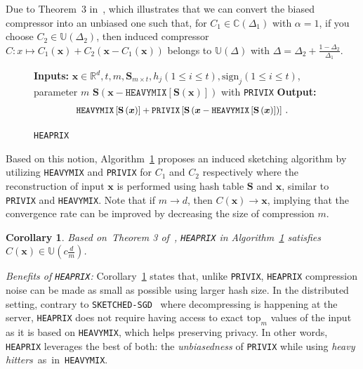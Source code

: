 \documentclass{article} %
\newtheorem{corollary}{Corollary}
\newcommand*{\Resize}[2]{\resizebox{#1}{!}{$#2$}}%
\begin{document}
Due to Theorem~$3$ in~\cite{horvath2020better}, which illustrates that we can convert the biased compressor into an unbiased one such that, for $C_1\in \mathbb{C}(\Delta_1)$ with $\alpha=1$, if you choose $C_2\in \mathbb{U}(\Delta_2)$, then induced compressor $C: x \mapsto C_1(\mathbf{x})+C_2\left(\mathbf{x}-C_1\left(\mathbf{x}\right)\right)$ belongs to $\mathbb{U}(\Delta)$ with $\Delta=\Delta_2+\frac{1-\Delta_2}{\Delta_1}$. 
\begin{figure}\vspace{-0.2in}
\begin{minipage}{\linewidth}
\begin{algorithm}[H]
\caption{\texttt{HEAPRIX} }\label{alg:heaprix}
\begin{algorithmic}[1]
\STATE \textbf{Inputs:} $\boldsymbol{x}\in\mathbb{R}^{d}, t, m, \mathbf{S}_{m\times t}, h_j (1\leq i\leq t), \text{sign}_j (1\leq i\leq t)$, parameter $m$
 $\mathbf{S}\left(\boldsymbol{x} - \texttt{HEAVYMIX}[\mathbf{S}(\boldsymbol{x})]\right)$ with \texttt{PRIVIX} 
\STATE \textbf{Output:}
\vspace{- 0.1cm}
\[ \Resize{7.4cm}{\texttt{HEAVYMIX}\left[\mathbf{S}\left(\boldsymbol{x}\right)\right]+\texttt{PRIVIX}\left[\mathbf{S}\left(\boldsymbol{x}-\texttt{HEAVYMIX}\left[\mathbf{S}\left(\boldsymbol{x}\right)\right]\right)\right]}\ .\]
\end{algorithmic}
\end{algorithm}
\vspace{-0.1in}
\end{minipage}\end{figure}
Based on this notion, Algorithm~\ref{alg:heaprix} proposes an induced sketching algorithm by utilizing \texttt{HEAVYMIX} and \texttt{PRIVIX} for $C_1$ and $C_2$ respectively where the reconstruction of input $\mathbf{x}$ is performed using hash table $\mathbf{S}$ and $\mathbf{x}$, similar to \texttt{PRIVIX} and \texttt{HEAVYMIX}.
Note that if $m\rightarrow d$, then $C(\boldsymbol{x})\rightarrow \boldsymbol{x}$, implying that the convergence rate  can be improved by decreasing the size of compression $m$. 
\begin{corollary}\label{cor:small}
Based on~Theorem 3 of~\citep{horvath2020better}, \texttt{HEAPRIX} in Algorithm~\ref{alg:heaprix} satisfies $C(\boldsymbol{x})\in \mathbb{U}(c \frac{d}{m})$. 
\end{corollary}
\textit{Benefits of \texttt{HEAPRIX}:} Corollary~\ref{cor:small} states that, unlike \texttt{PRIVIX}, \texttt{HEAPRIX} compression noise can be made as small as possible using larger hash size. 
In the distributed setting, 
contrary to \texttt{SKETCHED-SGD}~\cite{ivkin2019communication} where decompressing is happening at the server, \texttt{HEAPRIX} does not require having access to exact $\text{top}_m$ values of the input as it is based on \texttt{HEAVYMIX}, which helps preserving privacy.
In other words, \texttt{HEAPRIX} leverages the best of both: the \emph{unbiasedness} of \texttt{PRIVIX} while using \emph{heavy hitters}~as~in~\texttt{HEAVYMIX}.
\end{document}
